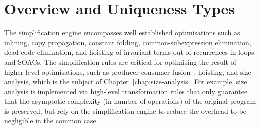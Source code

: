 \renewcommand{\sp}{~~~~~}
\newcommand{\ft}{\phi}
\newcommand{\fts}{\varphi}
\newcommand{\tty}{\rho}
\newcommand{\utty}{\hat{\rho}}
\newcommand{\sembox}[1]{\hfill \normalfont \mbox{\fbox{\(#1\)}}}
\newcommand{\sempart}[2]{\textrm{\textit{#1 \sembox{#2}}}}
\newcommand{\vdb}{\vd_\textrm{b}}
\newcommand{\vde}{\vd_\textrm{e}}
\newcommand{\vdp}{\vd_\textrm{p}}
\newcommand{\vdhp}{\vd_{\hat{\textrm{p}}}}
\newcommand{\vdP}{\vd_\textrm{P}}
\newcommand{\vda}{\vd_\textrm{a}}
\newcommand{\fracc}[2]{\begin{eqnarray} \frac{\begin{array}{c} #1
    \end{array}}{\begin{array}{c} #2 \end{array}} \end{eqnarray}}
\newcommand{\fraccn}[2]{\refstepcounter{equation}\mbox{$\frac{\begin{array}{c} #1 \end{array}}{\begin{array}{c} #2 \end{array}}$}~(\arabic{equation})}
\newcommand{\fraccc}[2]{\mbox{$\frac{\begin{array}{c} #1 \end{array}}{\begin{array}{c} #2 \end{array}}$}}
\newcommand{\fn}{\ensuremath{\lambda}}
\newcommand{\Fn}[3]{\fn#2:~#1~\rightarrow #3}
\newcommand{\FnU}[2]{\fn#1~\rightarrow #2}
\newcommand{\ubar}[1]{\underline{#1}}
\newcommand{\utau}{\hat{\tau}}
\newcommand{\etau}{\ubar{\tau}}
\newcommand{\opty}{\ubar{\phi}}
\newcommand{\Fun}[4]{\mbox{\lstinline[mathescape]!let\ #1\ #2\ :\ #3 =\ #4!}}

\chapter{Overview and Uniqueness Types}

The simplification engine encompasses well established optimisations
such as inlining, copy propagation, constant folding,
common-subexpression elimination, dead-code elimination, and hoisting
of invariant terms out of recurrences in loops and SOACs.  The
simplification rules are critical for optimising the result of
higher-level optimisations, such as producer-consumer
fusion~\cite{henriksen2014exploiting,henriksen2013t2}, hoisting, and
size analysis, which is the subject of
Chapter~\ref{chap:size-analysis}.  For example, size analysis is
implemented via high-level transformation rules that only guarantee
that the asymptotic complexity (in number of operations) of the
original program is preserved, but rely on the simplification engine
to reduce the overhead to be negligible in the common case.

